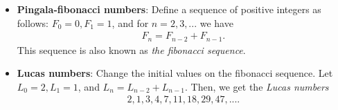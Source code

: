 \documentclass{report}
\begin{document}
\begin{itemize}
\begin{enumerate}
            \end{enumerate}
        \item \textbf{Pingala-fibonacci numbers}: Define a sequence of positive integers as follows: $F_{0} = 0, F_{1} = 1$, and for $n=2,3,... $ we have
            \begin{align*}
                F_{n} = F_{n-2} + F_{n-1}
            .\end{align*}
            This sequence is also known as \textit{the fibonacci sequence}.
        \item \textbf{Lucas numbers}: Change the initial values on the fibonacci sequence. Let $L_{0} = 2, L_{1} = 1$, and $L_{n} = L_{n-2} + L_{n-1}$. Then, we get the \textit{Lucas numbers}
            \begin{align*}
                2,1,3,4,7,11,18,29,47,...
            .\end{align*}

    \end{itemize}

\bye
\end{document}
